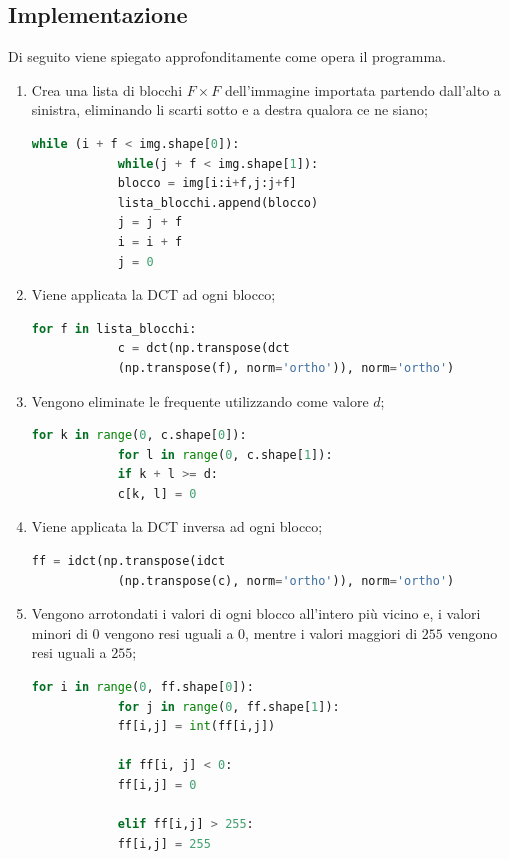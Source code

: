 \documentclass[preprint,12pt]{elsarticle}
\begin{document}
		\subsection{Implementazione}
		Di seguito viene spiegato approfonditamente come opera il programma.
		\begin{enumerate}
			\item Crea una lista di blocchi $F \times F$ dell'immagine importata partendo dall'alto a sinistra, eliminando li scarti sotto e a destra qualora ce ne siano;
			
			\begin{lstlisting}[language=Python]
			while (i + f < img.shape[0]):
			while(j + f < img.shape[1]):
			blocco = img[i:i+f,j:j+f]
			lista_blocchi.append(blocco)
			j = j + f
			i = i + f
			j = 0
			\end{lstlisting}
			
			\item Viene applicata la DCT ad ogni blocco;
			\begin{lstlisting}[language=Python]
			for f in lista_blocchi:
			c = dct(np.transpose(dct
			(np.transpose(f), norm='ortho')), norm='ortho')
			\end{lstlisting}
			
			\item Vengono eliminate le frequente utilizzando come valore $d$;
			\begin{lstlisting}[language=Python]
			for k in range(0, c.shape[0]):
			for l in range(0, c.shape[1]):
			if k + l >= d:
			c[k, l] = 0
			\end{lstlisting}
			
			\item Viene applicata la DCT inversa ad ogni blocco;
			\begin{lstlisting}[language=Python]
			ff = idct(np.transpose(idct
			(np.transpose(c), norm='ortho')), norm='ortho')
			\end{lstlisting}
			
			\item Vengono arrotondati i valori di ogni blocco all'intero più vicino e, i valori minori di $0$ vengono resi uguali a $0$, mentre i valori maggiori di $255$ vengono resi uguali a $255$;
			\begin{lstlisting}[language=Python]
			for i in range(0, ff.shape[0]):
			for j in range(0, ff.shape[1]):
			ff[i,j] = int(ff[i,j])
			
			if ff[i, j] < 0:
			ff[i,j] = 0
			
			elif ff[i,j] > 255:
			ff[i,j] = 255
			\end{lstlisting}
			

\end{enumerate}
\end{document}
